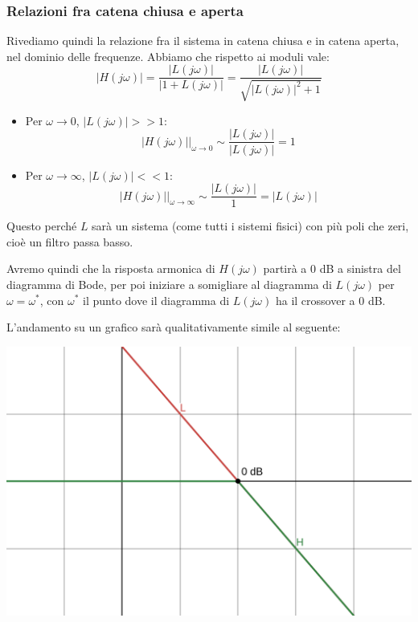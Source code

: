 \documentclass[a4paper,11pt]{article}
\begin{document}
\subsubsection{Relazioni fra catena chiusa e aperta}
Rivediamo quindi la relazione fra il sistema in catena chiusa e in catena aperta, nel dominio delle frequenze.
Abbiamo che rispetto ai moduli vale:
$$
|H(j\omega)| = \frac{|L(j\omega)|}{|1 + L(j\omega)|} = \frac{|L(j\omega)|}{\sqrt{|L(j\omega)|^2 + 1}}
$$
\begin{itemize}
	\item Per $\omega \rightarrow 0$, $|L(j\omega)| >> 1$:
		$$
		|H(j\omega)| \Big|_{\omega\rightarrow0} \sim \frac{|L(j\omega)|}{|L(j\omega)|} = 1
		$$
	\item Per $\omega \rightarrow \infty$, $|L(j\omega)| << 1$:
		$$
		|H(j\omega)| \Big|_{\omega\rightarrow\infty} \sim \frac{|L(j\omega)|}{1} = |L(j\omega)|
		$$
\end{itemize}
Questo perché $L$ sarà un sistema (come tutti i sistemi fisici) con più poli che zeri, cioè un filtro passa basso.

Avremo quindi che la risposta armonica di $H(j\omega)$ partirà a 0 dB a sinistra del diagramma di Bode, per poi iniziare a somigliare al diagramma di $L(j\omega)$ per $\omega = \omega^*$, con $\omega^*$ il punto dove il diagramma di $L(j\omega)$ ha il crossover a 0 dB. 

\noindent

\begin{minipage}{\textwidth}
	L'andamento su un grafico sarà qualitativamente simile al seguente:
	\begin{center}
		\includegraphics[scale=0.28]{../figures/lh.png}
	\end{center}

\end{minipage}
\end{document}
